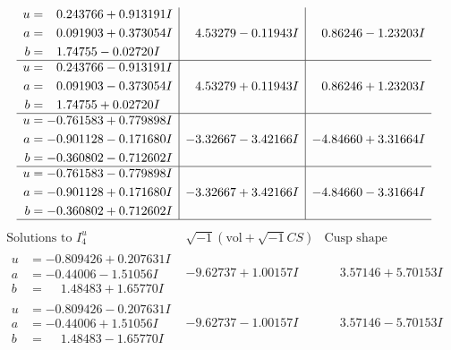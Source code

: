 \documentclass[1p]{elsarticle_modified}
\theoremstyle{definition}
\newcommand{\I}{\sqrt{-1}}
\begin{document}
$$\begin{array}{c|c|c}
\begin{aligned}
u &= \phantom{-}0.243766 + 0.913191 I \\
a &= \phantom{-}0.091903 + 0.373054 I \\
b &= \phantom{-}1.74755 - 0.02720 I\end{aligned}
 & \phantom{-}4.53279 - 0.11943 I & \phantom{-}0.86246 - 1.23203 I \\ \hline\begin{aligned}
u &= \phantom{-}0.243766 - 0.913191 I \\
a &= \phantom{-}0.091903 - 0.373054 I \\
b &= \phantom{-}1.74755 + 0.02720 I\end{aligned}
 & \phantom{-}4.53279 + 0.11943 I & \phantom{-}0.86246 + 1.23203 I \\ \hline\begin{aligned}
u &= -0.761583 + 0.779898 I \\
a &= -0.901128 - 0.171680 I \\
b &= -0.360802 - 0.712602 I\end{aligned}
 & -3.32667 - 3.42166 I & -4.84660 + 3.31664 I \\ \hline\begin{aligned}
u &= -0.761583 - 0.779898 I \\
a &= -0.901128 + 0.171680 I \\
b &= -0.360802 + 0.712602 I\end{aligned}
 & -3.32667 + 3.42166 I & -4.84660 - 3.31664 I\\
 \hline 
 \end{array}$$\newpage$$\begin{array}{c|c|c}  
\text{Solutions to }I^u_{4}& \I (\text{vol} + \sqrt{-1}CS) & \text{Cusp shape}\\
 \hline 
\begin{aligned}
u &= -0.809426 + 0.207631 I \\
a &= -0.44006 - 1.51056 I \\
b &= \phantom{-}1.48483 + 1.65770 I\end{aligned}
 & -9.62737 + 1.00157 I & \phantom{-}3.57146 + 5.70153 I \\ \hline\begin{aligned}
u &= -0.809426 - 0.207631 I \\
a &= -0.44006 + 1.51056 I \\
b &= \phantom{-}1.48483 - 1.65770 I\end{aligned}
 & -9.62737 - 1.00157 I & \phantom{-}3.57146 - 5.70153 I \\ \hline\begin{aligned}

\end{aligned}
\end{array}$$
\end{document}

